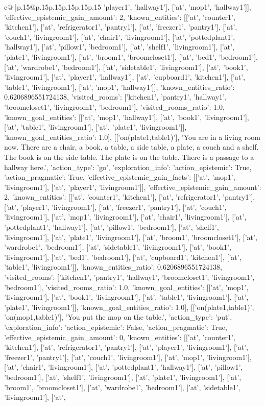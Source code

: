 \documentclass{article}
\begin{document}
{\begin{supertabular}{c@{$\;$}|p{.15\linewidth}@{}p{.15\linewidth}p{.15\linewidth}p{.15\linewidth}p{.15\linewidth}p{.15\linewidth}}
{{{'player1', 'hallway1'], ['at', 'mop1', 'hallway1']], 'effective_epistemic_gain_amount': 2, 'known_entities': [['at', 'counter1', 'kitchen1'], ['at', 'refrigerator1', 'pantry1'], ['at', 'freezer1', 'pantry1'], ['at', 'couch1', 'livingroom1'], ['at', 'chair1', 'livingroom1'], ['at', 'pottedplant1', 'hallway1'], ['at', 'pillow1', 'bedroom1'], ['at', 'shelf1', 'livingroom1'], ['at', 'plate1', 'livingroom1'], ['at', 'broom1', 'broomcloset1'], ['at', 'bed1', 'bedroom1'], ['at', 'wardrobe1', 'bedroom1'], ['at', 'sidetable1', 'livingroom1'], ['at', 'book1', 'livingroom1'], ['at', 'player1', 'hallway1'], ['at', 'cupboard1', 'kitchen1'], ['at', 'table1', 'livingroom1'], ['at', 'mop1', 'hallway1']], 'known_entities_ratio': 0.6206896551724138, 'visited_rooms': ['kitchen1', 'pantry1', 'hallway1', 'broomcloset1', 'livingroom1', 'bedroom1'], 'visited_rooms_ratio': 1.0, 'known_goal_entities': [['at', 'mop1', 'hallway1'], ['at', 'book1', 'livingroom1'], ['at', 'table1', 'livingroom1'], ['at', 'plate1', 'livingroom1']], 'known_goal_entities_ratio': 1.0}}], [['on(plate1,table1)'], 'You are in a living room now. There are a chair, a book, a table, a side table, a plate, a couch and a shelf. The book is on the side table. The plate is on the table. There is a passage to a hallway here.', {'action_type': 'go', 'exploration_info': {'action_epistemic': True, 'action_pragmatic': True, 'effective_epistemic_gain_facts': [['at', 'mop1', 'livingroom1'], ['at', 'player1', 'livingroom1']], 'effective_epistemic_gain_amount': 2, 'known_entities': [['at', 'counter1', 'kitchen1'], ['at', 'refrigerator1', 'pantry1'], ['at', 'player1', 'livingroom1'], ['at', 'freezer1', 'pantry1'], ['at', 'couch1', 'livingroom1'], ['at', 'mop1', 'livingroom1'], ['at', 'chair1', 'livingroom1'], ['at', 'pottedplant1', 'hallway1'], ['at', 'pillow1', 'bedroom1'], ['at', 'shelf1', 'livingroom1'], ['at', 'plate1', 'livingroom1'], ['at', 'broom1', 'broomcloset1'], ['at', 'wardrobe1', 'bedroom1'], ['at', 'sidetable1', 'livingroom1'], ['at', 'book1', 'livingroom1'], ['at', 'bed1', 'bedroom1'], ['at', 'cupboard1', 'kitchen1'], ['at', 'table1', 'livingroom1']], 'known_entities_ratio': 0.6206896551724138, 'visited_rooms': ['kitchen1', 'pantry1', 'hallway1', 'broomcloset1', 'livingroom1', 'bedroom1'], 'visited_rooms_ratio': 1.0, 'known_goal_entities': [['at', 'mop1', 'livingroom1'], ['at', 'book1', 'livingroom1'], ['at', 'table1', 'livingroom1'], ['at', 'plate1', 'livingroom1']], 'known_goal_entities_ratio': 1.0}}], [['on(plate1,table1)', 'on(mop1,table1)'], 'You put the mop on the table.', {'action_type': 'put', 'exploration_info': {'action_epistemic': False, 'action_pragmatic': True, 'effective_epistemic_gain_amount': 0, 'known_entities': [['at', 'counter1', 'kitchen1'], ['at', 'refrigerator1', 'pantry1'], ['at', 'player1', 'livingroom1'], ['at', 'freezer1', 'pantry1'], ['at', 'couch1', 'livingroom1'], ['at', 'mop1', 'livingroom1'], ['at', 'chair1', 'livingroom1'], ['at', 'pottedplant1', 'hallway1'], ['at', 'pillow1', 'bedroom1'], ['at', 'shelf1', 'livingroom1'], ['at', 'plate1', 'livingroom1'], ['at', 'broom1', 'broomcloset1'], ['at', 'wardrobe1', 'bedroom1'], ['at', 'sidetable1', 'livingroom1'], ['at', }}}
\end{supertabular}}
\end{document}
